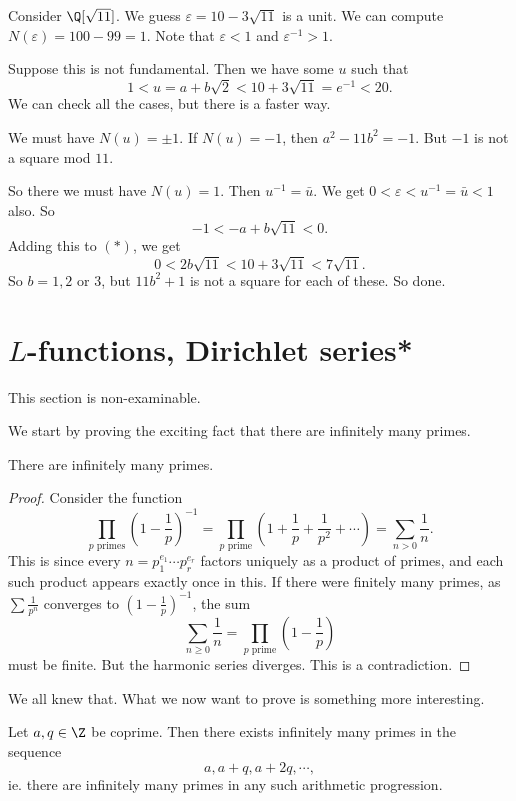 \documentclass[a4paper]{article}
\begin{document}
\begin{eg}
  Consider $\Q[\sqrt{11}]$. We guess $\varepsilon = 10 - 3\sqrt{11}$ is a unit. We can compute $N(\varepsilon) = 100 - 99 = 1$. Note that $\varepsilon < 1$ and $\varepsilon^{-1} > 1$.

  Suppose this is not fundamental. Then we have some $u$ such that
  \[
    1 < u = a + b\sqrt{2} < 10 + 3\sqrt{11} = e^{-1} < 20.\tag{$*$}
  \]
  We can check all the cases, but there is a faster way.

  We must have $N(u) = \pm 1$. If $N(u) = -1$, then $a^2 - 11b^2 = -1$. But $-1$ is not a square mod $11$.

  So there we must have $N(u) = 1$. Then $u^{-1} = \bar{u}$. We get $0 < \varepsilon < u^{-1} = \bar{u} < 1$ also. So
  \[
    -1 < -a + b\sqrt{11} < 0.
  \]
  Adding this to $(*)$, we get
  \[
    0 < 2b\sqrt{11} < 10 + 3\sqrt{11} < 7\sqrt{11}.
  \]
  So $b = 1, 2$ or $3$, but $11b^2 + 1$ is not a square for each of these. So done.
\end{eg}

\section{\texorpdfstring{$L$}{L}-functions, Dirichlet series*}
This section is non-examinable.

We start by proving the exciting fact that there are infinitely many primes.
\begin{thm}[Euclid]
  There are infinitely many primes.
\end{thm}

\begin{proof}
  Consider the function
  \[
    \prod_{p\text{ primes}} \left(1 - \frac{1}{p}\right)^{-1} = \prod_{p\text{ prime}}\left(1 + \frac{1}{p} + \frac{1}{p^2} + \cdots\right) = \sum_{n > 0}\frac{1}{n}.
  \]
  This is since every $n = p_1^{e_1} \cdots p_r^{e_r}$ factors uniquely as a product of primes, and each such product appears exactly once in this. If there were finitely many primes, as $\sum \frac{1}{p^n}$ converges to $\left(1 - \frac{1}{p}\right)^{-1}$, the sum
  \[
    \sum_{n \geq 0}\frac{1}{n} = \prod_{p\text{ prime}} \left(1 - \frac{1}{p}\right)
  \]
  must be finite. But the harmonic series diverges. This is a contradiction.
\end{proof}

We all knew that. What we now want to prove is something more interesting.
\begin{thm}
  Let $a, q \in \Z$ be coprime. Then there exists infinitely many primes in the sequence
  \[
    a, a + q, a + 2q, \cdots,
  \]
  ie. there are infinitely many primes in any such arithmetic progression.
\end{thm}
\end{document}
